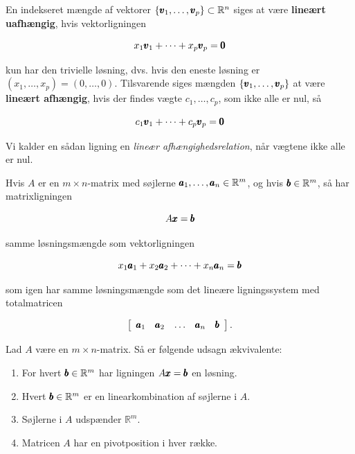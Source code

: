 \begin{definition}
    En indekseret mængde af vektorer $\left\{\pmb{v}_1, \ldots, \pmb{v}_p\right\} \subset \mathbb{R}^n$ siges at være \textbf{lineært uafhængig}, hvis vektorligningen
    
    \[
    x_1 \pmb{v}_1 + \cdots + x_p \pmb{v}_p = \pmb{0}
    \]
    
    kun har den trivielle løsning, dvs. hvis den eneste løsning er $\left(x_1, \ldots, x_p\right) = (0, \ldots, 0)$. Tilsvarende siges mængden $\left\{\pmb{v}_1, \ldots, \pmb{v}_p\right\}$ at være \textbf{lineært afhængig}, hvis der findes vægte $c_1, \ldots, c_p$, som ikke alle er nul, så
    
    \[
    c_1 \pmb{v}_1 + \cdots + c_p \pmb{v}_p = \pmb{0}
    \]
    
    Vi kalder en sådan ligning en \textit{lineær afhængighedsrelation}, når vægtene ikke alle er nul.
\end{definition}

\begin{theorem}
    Hvis $A$ er en $m \times n$-matrix med søjlerne $\pmb{a}_1, \ldots, \pmb{a}_n \in \mathbb{R}^m$, og hvis $\pmb{b} \in \mathbb{R}^m$, så har matrixligningen

\[
A \pmb{x} = \pmb{b}
\]

samme løsningsmængde som vektorligningen

\[
x_1 \pmb{a}_1 + x_2 \pmb{a}_2 + \cdots + x_n \pmb{a}_n = \pmb{b}
\]

som igen har samme løsningsmængde som det lineære ligningssystem med totalmatricen

\[
\left[\begin{array}{lllll}
\pmb{a}_1 & \pmb{a}_2 & \ldots & \pmb{a}_n & \pmb{b}
\end{array}\right].
\]

\end{theorem}

\begin{theorem}
Lad \( A \) være en \( m \times n \)-matrix. Så er følgende udsagn ækvivalente:
\begin{enumerate}[label=(\alph*)]
    \item For hvert \( \pmb{b} \in \mathbb{R}^m \) har ligningen \( A \pmb{x} = \pmb{b} \) en løsning.
    \item Hvert \( \pmb{b} \in \mathbb{R}^m \) er en linearkombination af søjlerne i \( A \).
    \item Søjlerne i \( A \) udspænder \( \mathbb{R}^m \).
    \item Matricen \( A \) har en pivotposition i hver række.
\end{enumerate}
\end{theorem}

